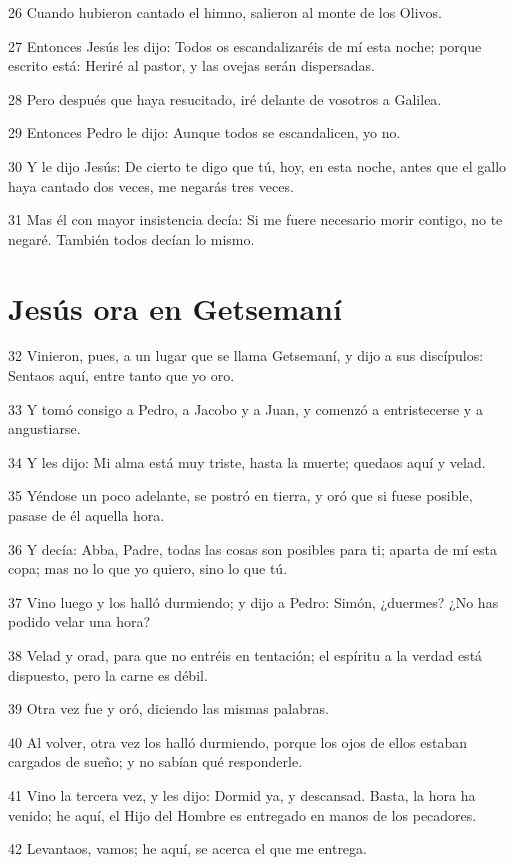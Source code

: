 \par 26 Cuando hubieron cantado el himno, salieron al monte de los Olivos.
\par 27 Entonces Jesús les dijo: Todos os escandalizaréis de mí esta noche; porque escrito está: Heriré al pastor, y las ovejas serán dispersadas.
\par 28 Pero después que haya resucitado, iré delante de vosotros a Galilea.
\par 29 Entonces Pedro le dijo: Aunque todos se escandalicen, yo no.
\par 30 Y le dijo Jesús: De cierto te digo que tú, hoy, en esta noche, antes que el gallo haya cantado dos veces, me negarás tres veces.
\par 31 Mas él con mayor insistencia decía: Si me fuere necesario morir contigo, no te negaré. También todos decían lo mismo.

\section*{Jesús ora en Getsemaní}

\par 32 Vinieron, pues, a un lugar que se llama Getsemaní, y dijo a sus discípulos: Sentaos aquí, entre tanto que yo oro.
\par 33 Y tomó consigo a Pedro, a Jacobo y a Juan, y comenzó a entristecerse y a angustiarse.
\par 34 Y les dijo: Mi alma está muy triste, hasta la muerte; quedaos aquí y velad.
\par 35 Yéndose un poco adelante, se postró en tierra, y oró que si fuese posible, pasase de él aquella hora.
\par 36 Y decía: Abba, Padre, todas las cosas son posibles para ti; aparta de mí esta copa; mas no lo que yo quiero, sino lo que tú.
\par 37 Vino luego y los halló durmiendo; y dijo a Pedro: Simón, ¿duermes? ¿No has podido velar una hora?
\par 38 Velad y orad, para que no entréis en tentación; el espíritu a la verdad está dispuesto, pero la carne es débil.
\par 39 Otra vez fue y oró, diciendo las mismas palabras.
\par 40 Al volver, otra vez los halló durmiendo, porque los ojos de ellos estaban cargados de sueño; y no sabían qué responderle.
\par 41 Vino la tercera vez, y les dijo: Dormid ya, y descansad. Basta, la hora ha venido; he aquí, el Hijo del Hombre es entregado en manos de los pecadores.
\par 42 Levantaos, vamos; he aquí, se acerca el que me entrega.

